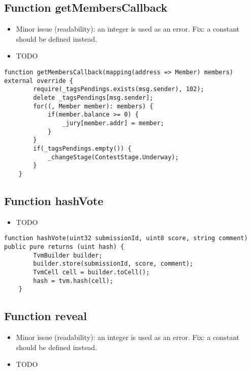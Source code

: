 \subsection{Function getMembersCallback}

\begin{itemize}
\item Minor issue (readability): an integer is used as an error. Fix:
  a constant should be defined instead.
\item TODO
\end{itemize}

\begin{lstlisting}[firstnumber=87]
    function getMembersCallback(mapping(address => Member) members) external override {
        require(_tagsPendings.exists(msg.sender), 102);
        delete _tagsPendings[msg.sender];
        for((, Member member): members) {
            if(member.balance >= 0) {
                _jury[member.addr] = member;
            }
        }
        if(_tagsPendings.empty()) {
            _changeStage(ContestStage.Underway);
        }
    }
\end{lstlisting}

\subsection{Function hashVote}

\begin{itemize}
\item TODO
\end{itemize}

\begin{lstlisting}[firstnumber=223]
    function hashVote(uint32 submissionId, uint8 score, string comment) public pure returns (uint hash) {
        TvmBuilder builder;
        builder.store(submissionId, score, comment);
        TvmCell cell = builder.toCell();
        hash = tvm.hash(cell);
    }
\end{lstlisting}

\subsection{Function reveal}

\begin{itemize}
\item Minor issue (readability): an integer is used as an error. Fix:
  a constant should be defined instead.
\item TODO
\end{itemize}


